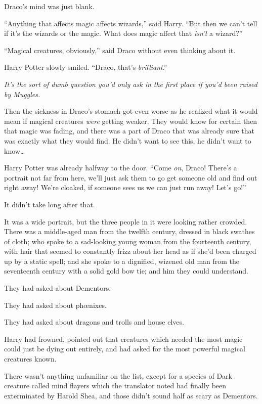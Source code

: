 Draco’s mind was just blank.

“Anything that affects magic affects wizards,” said Harry. “But then we can’t tell if it’s the wizards or the magic. What does magic affect that \emph{isn’t} a wizard?”

“Magical creatures, obviously,” said Draco without even thinking about it.

Harry Potter slowly smiled. “Draco, that’s \emph{brilliant}.”

\emph{It’s the sort of dumb question you’d only ask in the first place if you’d been raised by Muggles.}

Then the sickness in Draco’s stomach got even worse as he realized what it would mean if magical creatures \emph{were} getting weaker. They would know for certain then that magic was fading, and there was a part of Draco that was already sure that was exactly what they would find. He didn’t want to see this, he didn’t want to know…

Harry Potter was already halfway to the door. “Come \emph{on}, Draco! There’s a portrait not far from here, we’ll just ask them to go get someone old and find out right away! We’re cloaked, if someone sees us we can just run away! Let’s go!”

\later

It didn’t take long after that.

It was a wide portrait, but the three people in it were looking rather crowded. There was a middle-aged man from the twelfth century, dressed in black swathes of cloth; who spoke to a sad-looking young woman from the fourteenth century, with hair that seemed to constantly frizz about her head as if she’d been charged up by a static spell; and she spoke to a dignified, wizened old man from the seventeenth century with a solid gold bow tie; and him they could understand.

They had asked about Dementors.

They had asked about phœnixes.

They had asked about dragons and trolls and house elves.

Harry had frowned, pointed out that creatures which needed the most magic could just be dying out entirely, and had asked for the most powerful magical creatures known.

There wasn’t anything unfamiliar on the list, except for a species of Dark creature called mind flayers which the translator noted had finally been exterminated by Harold Shea, and those didn’t sound half as scary as Dementors.

